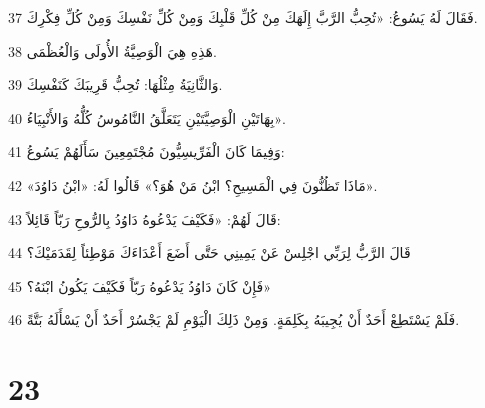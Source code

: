 \par 37 فَقَالَ لَهُ يَسُوعُ: «تُحِبُّ الرَّبَّ إِلَهَكَ مِنْ كُلِّ قَلْبِكَ وَمِنْ كُلِّ نَفْسِكَ وَمِنْ كُلِّ فِكْرِكَ.
\par 38 هَذِهِ هِيَ الْوَصِيَّةُ الأُولَى وَالْعُظْمَى.
\par 39 وَالثَّانِيَةُ مِثْلُهَا: تُحِبُّ قَرِيبَكَ كَنَفْسِكَ.
\par 40 بِهَاتَيْنِ الْوَصِيَّتَيْنِ يَتَعَلَّقُ النَّامُوسُ كُلُّهُ وَالأَنْبِيَاءُ».
\par 41 وَفِيمَا كَانَ الْفَرِّيسِيُّونَ مُجْتَمِعِينَ سَأَلَهُمْ يَسُوعُ:
\par 42 «مَاذَا تَظُنُّونَ فِي الْمَسِيحِ؟ ابْنُ مَنْ هُوَ؟» قَالُوا لَهُ: «ابْنُ دَاوُدَ».
\par 43 قَالَ لَهُمْ: «فَكَيْفَ يَدْعُوهُ دَاوُدُ بِالرُّوحِ رَبّاً قَائِلاً:
\par 44 قَالَ الرَّبُّ لِرَبِّي اجْلِسْ عَنْ يَمِينِي حَتَّى أَضَعَ أَعْدَاءَكَ مَوْطِئاً لِقَدَمَيْكَ؟
\par 45 فَإِنْ كَانَ دَاوُدُ يَدْعُوهُ رَبّاً فَكَيْفَ يَكُونُ ابْنَهُ؟»
\par 46 فَلَمْ يَسْتَطِعْ أَحَدٌ أَنْ يُجِيبَهُ بِكَلِمَةٍ. وَمِنْ ذَلِكَ الْيَوْمِ لَمْ يَجْسُرْ أَحَدٌ أَنْ يَسْأَلَهُ بَتَّةً.

\chapter{23}

